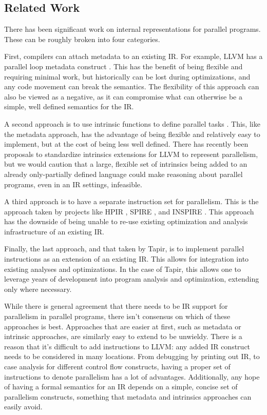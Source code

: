 \documentclass[sigconf]{acmart}
\begin{document}
\subsection{Related Work} \label{Sec:Related}

There has been significant work on internal representations for parallel
programs. These can be roughly broken into four categories. 

First, compilers can attach metadata to an existing IR. For example, LLVM has a
parallel loop metadata construct \cite{llvmref}. This has the benefit of being
flexible and requiring minimal work, but historically can be lost during
optimizations, and any code movement can break the semantics. The flexibility
of this approach can also be viewed as a negative, as it can compromise
what can otherwise be a simple, well defined semantics for the IR. 

A second approach is to use intrinsic functions to define parallel tasks
\cite{ares}. This, like the metadata approach, has the advantage of being
flexible and relatively easy to implement, but at the cost of being less well
defined. There has recently been proposals to standardize intrinsics extensions
for LLVM to represent parallelism, but we would caution that a large, flexible
set of intrinsics being added to an already only-partially defined
\cite{verillvm} language could make reasoning about parallel programs, even
in an IR settings, infeasible. 

A third approach is to have a separate instruction set for parallelism. This is
the approach taken by projects like HPIR \cite{zhao2011intermediate}, SPIRE
\cite{khaldi2012spire}, and INSPIRE \cite{jordan2013inspire}. This approach has
the downside of being unable to re-use existing optimization and analysis
infrastructure of an existing IR. 

Finally, the last approach, and that taken by Tapir, is to implement parallel 
instructions as an extension of an existing IR. This allows for integration
into existing analyses and optimizations. In the case of Tapir, this allows one
to leverage years of development into program analysis and optimization,
extending only where necessary. 

While there is general agreement that there needs to be IR support for
parallelism in parallel programs, there isn't consensus on which of these
approaches is best. Approaches that are easier at first, such as metadata
or intrinsic approaches, are similarly easy to extend to be unwieldy. There is
a reason that it's difficult to add instructions to LLVM: any added IR
construct needs to be considered in many locations. From debugging by printing
out IR, to case analysis for different control flow constructs, having 
a proper set of instructions to denote parallelism has a lot of advantages. 
Additionally, any hope of having a formal semantics for an IR depends on a 
simple, concise set of parallelism constructs, something that metadata and
intrinsics approaches can easily avoid. 
\end{document}
